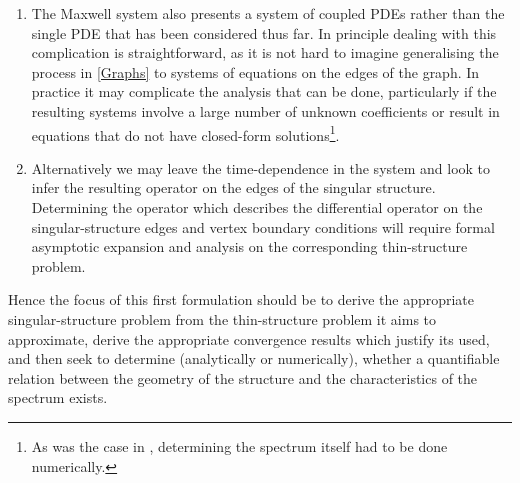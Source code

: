 \begin{enumerate}
	\item The Maxwell system also presents a system of coupled PDEs rather than the single PDE that has been considered thus far.
In principle dealing with this complication is straightforward, as it is not hard to imagine generalising the process in \cref{Graphs} to systems of equations on the edges of the graph. 
In practice it may complicate the analysis that can be done, particularly if the resulting systems involve a large number of unknown coefficients or result in equations that do not have closed-form solutions\footnote{As was the case in , determining the spectrum itself had to be done numerically.}. 
	\item Alternatively we may leave the time-dependence in the system and look to infer the resulting operator on the edges of the singular structure.
Determining the operator which describes the differential operator on the singular-structure edges and vertex boundary conditions will require formal asymptotic expansion and analysis on the corresponding thin-structure problem.
\end{enumerate}
Hence the focus of this first formulation should be to derive the appropriate singular-structure problem from the thin-structure problem it aims to approximate, derive the appropriate convergence results which justify its used, and then seek to determine (analytically or numerically), whether a quantifiable relation between the geometry of the structure and the characteristics of the spectrum exists. \newline

